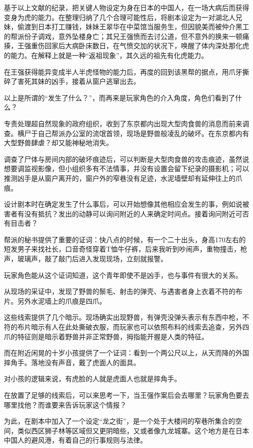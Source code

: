 \documentclass[a4paper,zihao=-4,notitlepage,twoside,openright]{ctexart}
\begin{document}
基于以上文献的纪录，把关键人物设定为身在日本的中国人，在一场大病后而获得变身为虎的能力。在整理归纳了几个合理可能性后，将剧本设定为一对湖北人兄妹，偷渡到日本打工赚钱，妹妹王翠华在中菜馆当服务生，但因貌美而被仲介黑工的帮派份子调戏，意外坠楼身亡；其兄王强愤而去讨公道，但不意外的换来一顿痛揍，王强重伤回家后大病卧床数日，在气愤交加的状况下，唤醒了体内深处那化虎的能力。在解释上就是一种“返祖现象”，其久远的祖先有化虎能力。

在王强获得能异变成半人半虎怪物的能力后，再度的回到该黑帮的据点，用爪牙撕碎了害死其妹的凶手，接着从窗户逃窜出去。

以上是所谓的“发生了什么？”，而再来是玩家角色的介入角度，角色们看到了什么？

专责处理超自然现象的政府组织，收到了东京都内出现大型肉食兽的消息而前来调查。横尸于自己帮派办公室的流氓首领，现场是野兽般凌乱的破坏。在东京都内有大型野兽肆虐？却又能神秘地消失。

调查了尸体与房间内部的破坏痕迹后，可以判断是大型肉食兽的攻击痕迹，虽然说想要调监视影像，但小组织多有不法情事，并没有设置会留下纪录的摄影机；可以推测凶手是从窗户离开的，窗户外的窄巷没有足迹，水泥墙壁却有延伸往上的爪痕。

设计剧本时在确定发生了什么事后，可以开始想像其他相应会发生的事，例如说被害者有没有抵抗？发出的动静可以询问附近的人来确定时间点。接着询问附近可否有目击者？

帮派的秘书提供了重要的证词：快八点的时候，有一个二十出头，身高170左右的短发男子来找社长，口音奇怪穿着T恤牛仔裤，后来我听到吵闹声，重物撞击，枪声，玻璃声，敲了敲门后进入发现现场，立刻就报警。

玩家角色能从这个证词知道，这个青年即使不是凶手，也与事件有很大的关系。

从现场的采证中，发现了野兽的鬃毛、射击的弹壳、与遇害者身上衣着不符的布片。另外水泥墙上的爪痕是四爪。

这些线索提供了几个暗示。现场确实出现野兽，有弹壳没弹头表示有东西中枪，不符的布片暗示有人在此处撕破衣服，而玩家也可以依照布料的线索去追查，另外四爪的特征则是暗示着野兽并非正常野兽，拇指能开握是人类的特征。

而在附近闲晃的十岁小孩提供了一个证词：看到一个两公尺以上，从天而降的外国摔角手。落地没有声音，戴了虎面人的面具。

对小孩的逻辑来说，有虎脸的人就是虎面人也就是摔角手。

在放置了足够的线索后，可以来思考一下，当王强作案后会去哪里？玩家角色要去哪里找他？而谁要来告诉玩家这个情报？

为此，在剧本中加入了一个设定“龙之街”，是一个处于大楼间的窄巷所集合的空间，类似西区狮子林等区域但又更阴暗些，又或者像九龙城寨。这个地方是在日本中国人的避风港，有着自己的行事规则与法律。
\end{document}

